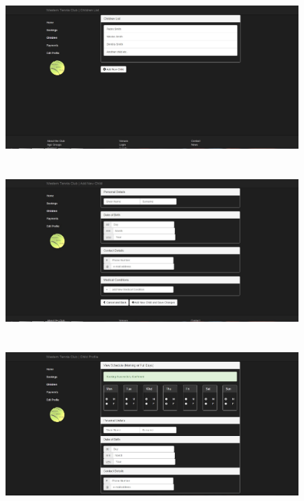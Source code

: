 \documentclass{l3proj}
\begin{document}
{
\begin{figure}[h]
\includegraphics[scale=0.35]{parenttemplate6.jpg}
\\
\\
\\
\includegraphics[scale=0.35]{parenttemplate5.jpg}
\\
\\
\\
\includegraphics[scale=0.35]{parenttemplate4.jpg}
\end{figure}
}
\end{document}

